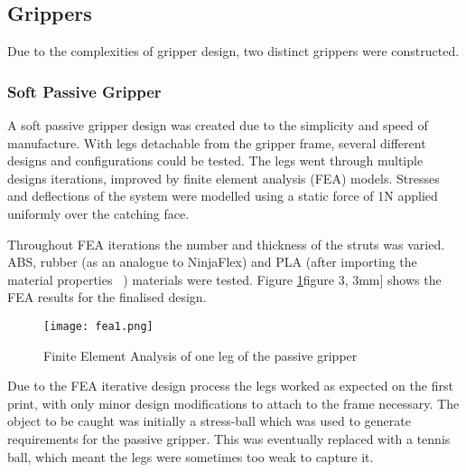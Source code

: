\documentclass[conference]{IEEEtran}
\begin{document}
\subsection{Grippers}
Due to the complexities of gripper design, two distinct grippers were constructed.
\subsubsection{Soft Passive Gripper}
A soft passive gripper design was created due to the simplicity and speed of manufacture. With legs detachable from the gripper frame, several different designs and configurations could be tested. The legs went through multiple designs iterations, improved by finite element analysis (FEA) models. Stresses and deflections of the system were modelled using a static force of 1N applied uniformly over the catching face.

Throughout FEA iterations the number and thickness of the struts was varied. ABS, rubber (as an analogue to NinjaFlex) and PLA (after importing the material properties ~\cite{CRF3:CRF3126}) materials were tested. Figure \ref{fea1}figure 3, 3mm] shows the FEA results for the finalised design.

\begin{figure}\label{fea1}
	\centering
	\texttt{[image: fea1.png]}
	\caption{Finite Element Analysis of one leg of the passive gripper}
\end{figure}

Due to the FEA iterative design process the legs worked as expected on the first print, with only minor design modifications to attach to the frame necessary. The object to be caught was initially a stress-ball which was used to generate requirements for the passive gripper. This was eventually replaced with a tennis ball, which meant the legs were sometimes too weak to capture it. 
\end{document}

